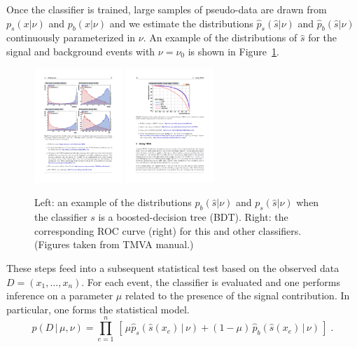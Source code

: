 \documentclass[12pt]{article}
\numberwithin{equation}{section}
\theoremstyle{plain}
\begin{document}
 Once the classifier is trained, large samples of pseudo-data are drawn from
 $p_s(x | \nu)$ and $p_b(x | \nu)$ and we estimate the distributions
 $\hat{p}_s(\hat s | \nu)$ and $\hat{p}_b(\hat s | \nu)$ continuously
 parameterized in $\nu$. An example of the distributions of $\hat s$ for the
 signal and background events with $\nu=\nu_0$ is shown in
 Figure~\ref{fig:tmva}.

\begin{figure}[t]
\begin{center}
 \includegraphics[height=1.7in]{figures/example-TMVA-BDT.pdf}
 \includegraphics[height=1.7in]{figures/example-TMVA-ROC.pdf}
\caption{Left: an example of the distributions $p_b(\hat s|\nu)$ and $p_s(\hat s|\nu)$ when the classifier $s$ is a boosted-decision tree (BDT). Right: the corresponding ROC curve (right) for this and other classifiers. (Figures taken from TMVA manual.)}
\label{fig:tmva}
\end{center}
\end{figure}

These steps feed into a subsequent statistical test based on the observed data
${D=(x_1, \dots, x_n)}$. For each event, the classifier is evaluated and one
performs inference on a parameter $\mu$ related to the presence of the signal
contribution. In particular, one forms the statistical model.
\begin{equation}\label{eq:typicalML}
p( D \,|\, \mu, \nu) = \prod_{e=1}^n \, \left[\, \mu \hat{p}_s( \hat s(x_e) \, |\,  \nu)  + (1-\mu)\, \hat{p}_b( \hat s(x_e) \,|\, \nu) \,\right] \; .
\end{equation}
\end{document}
